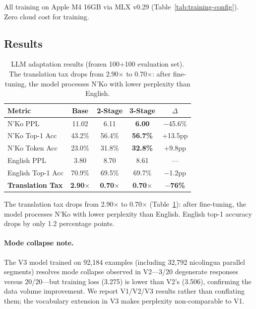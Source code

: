 \documentclass[11pt]{article}
\begin{document}
All training on Apple M4 16GB via MLX v0.29 (Table~\ref{tab:training-config}).
Zero cloud cost for training.

\subsection{Results}

\begin{table}[t]
\centering
\small
\begin{tabular}{lcccc}
\toprule
\textbf{Metric} & \textbf{Base} & \textbf{2-Stage} & \textbf{3-Stage} & \textbf{$\Delta$} \\
\midrule
N'Ko PPL & 11.02 & 6.11 & \textbf{6.00} & $-$45.6\% \\
N'Ko Top-1 Acc & 43.2\% & 56.4\% & \textbf{56.7\%} & +13.5pp \\
N'Ko Token Acc & 23.0\% & 31.8\% & \textbf{32.8\%} & +9.8pp \\
\midrule
English PPL & 3.80 & 8.70 & 8.61 & --- \\
English Top-1 Acc & 70.9\% & 69.5\% & 69.7\% & $-$1.2pp \\
\midrule
\textbf{Translation Tax} & \textbf{2.90$\times$} & \textbf{0.70$\times$} & \textbf{0.70$\times$} & \textbf{$-$76\%} \\
\bottomrule
\end{tabular}
\caption{LLM adaptation results (frozen 100+100 evaluation set). The translation tax drops from 2.90$\times$ to 0.70$\times$: after fine-tuning, the model processes N'Ko with lower perplexity than English.}
\label{tab:main-results}
\end{table}

The translation tax drops from 2.90$\times$ to 0.70$\times$ (Table~\ref{tab:main-results}): after fine-tuning, the model processes N'Ko with lower perplexity than English.
English top-1 accuracy drops by only 1.2 percentage points.

\paragraph{Mode collapse note.}
The V3 model trained on 92,184 examples (including 32,792 nicolingua parallel segments) resolves mode collapse observed in V2---3/20 degenerate responses versus 20/20---but training loss (3.275) is lower than V2's (3.506), confirming the data volume improvement.
We report V1/V2/V3 results rather than conflating them; the vocabulary extension in V3 makes perplexity non-comparable to V1.
\end{document}

